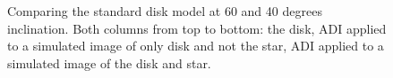 \begin{figure}[h!]
  \caption{Comparing the standard disk model at 60 and 40 degrees inclination. Both columns from top to bottom: the disk, \ac{ADI} applied to a simulated image of only disk and not the star, \ac{ADI} applied to a simulated image of the disk and star.}
  \label{fig:comp_rot}
\end{figure}
